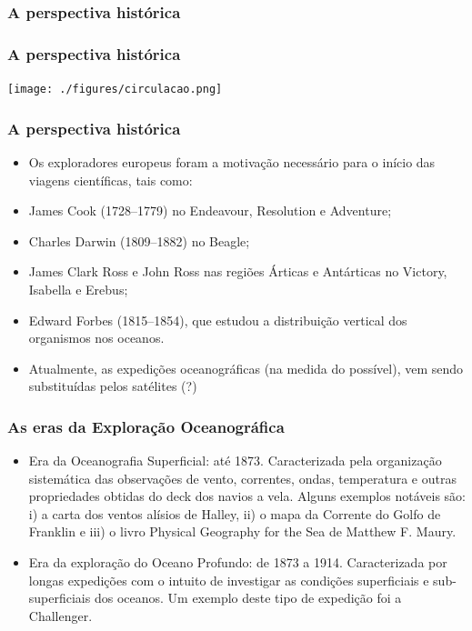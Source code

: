\begin{frame}
    \frametitle{A perspectiva histórica}
    \centerline{}
\end{frame}

\begin{frame}
    \frametitle{A perspectiva histórica}
    \centerline{\texttt{[image: ./figures/circulacao.png]}}
\end{frame}

\begin{frame}
    \frametitle{A perspectiva histórica}
\small{
    \begin{itemize}[<+-| alert@+>]
        \item Os exploradores europeus foram a motivação necessário para o início
            das viagens científicas, tais como:
        \item James Cook (1728--1779) no Endeavour, Resolution e Adventure;
        \item Charles Darwin (1809--1882) no Beagle;
        \item James Clark Ross e John Ross nas regiões Árticas e Antárticas no
            Victory, Isabella e Erebus;
        \item Edward Forbes (1815--1854), que estudou a distribuição vertical dos
            organismos nos oceanos.
        \item Atualmente, as expedições oceanográficas (na medida do possível),
              vem sendo substituídas pelos satélites (?)
    \end{itemize}
}
\end{frame}

\begin{frame}
    \frametitle{As eras da Exploração Oceanográfica}
\small{
    \begin{itemize}[<+-| alert@+>]
        \item Era da Oceanografia Superficial: até 1873. Caracterizada pela
              organização sistemática das observações de vento, correntes,
              ondas, temperatura e outras propriedades obtidas do deck dos
              navios a vela.  Alguns exemplos notáveis são: i) a carta dos
              ventos alísios de Halley, ii) o mapa da Corrente do Golfo de
              Franklin e iii) o livro Physical Geography for the Sea de Matthew
              F. Maury.
        \item Era da exploração do Oceano Profundo: de 1873 a 1914.
        Caracterizada por longas expedições com o intuito de investigar as
        condições superficiais e sub-superficiais dos oceanos. Um exemplo
        deste tipo de expedição foi a Challenger.
    \end{itemize}
}
\end{frame}

